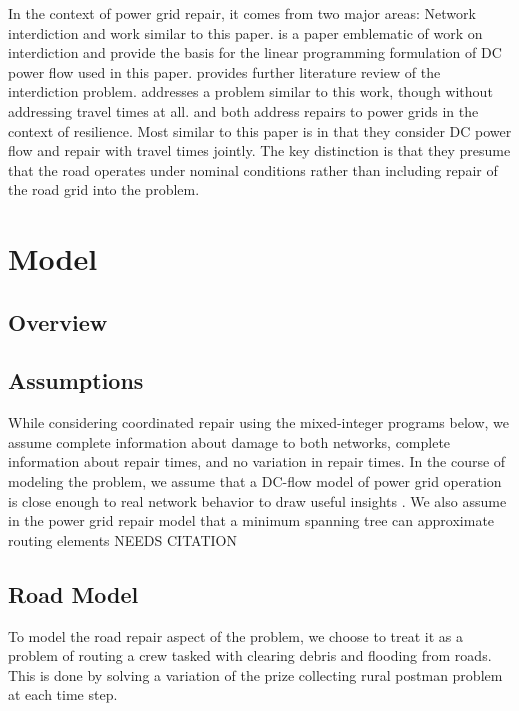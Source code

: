 \documentclass[10pt]{article}
\newcounter{step}
\begin{document}
In the context of power grid repair, it comes from two major areas: Network interdiction and work similar to this paper. \cite{SalmeronEA2010} is a paper emblematic of work on interdiction and provide the basis for the linear programming formulation of DC power flow used in this paper. \cite{Wood2011} provides further literature review of the interdiction problem. \cite{NPSMasters} addresses a problem similar to this work, though without addressing travel times at all. \cite{ArabEA2015} and \cite{MousavizadehEA2018} both address repairs to power grids in the context of resilience. Most similar to this paper is \cite{BentEA2011} in that they consider DC power flow and repair with travel times jointly. The key distinction is that they presume that the road operates under nominal conditions rather than including repair of the road grid into the problem.

\section{\large{Model}}
\vspace*{-12pt}
\subsection{Overview}

\subsection{Assumptions}
\vspace*{-12pt}
While considering coordinated repair using the mixed-integer programs below, we assume complete information about damage to both networks, complete information about repair times, and no variation in repair times. In the course of modeling the problem, we assume that a DC-flow model of power grid operation is close enough to real network behavior to draw useful insights \cite{QiEA2012}. We also assume in the power grid repair model that a minimum spanning tree can approximate routing elements NEEDS CITATION 
\subsection{Road Model}
\vspace*{-12pt}
To model the road repair aspect of the problem, we choose to treat it as a problem of routing a crew tasked with clearing debris and flooding from roads. This is done by solving a variation of the prize collecting rural postman problem at each time step.
\end{document}
